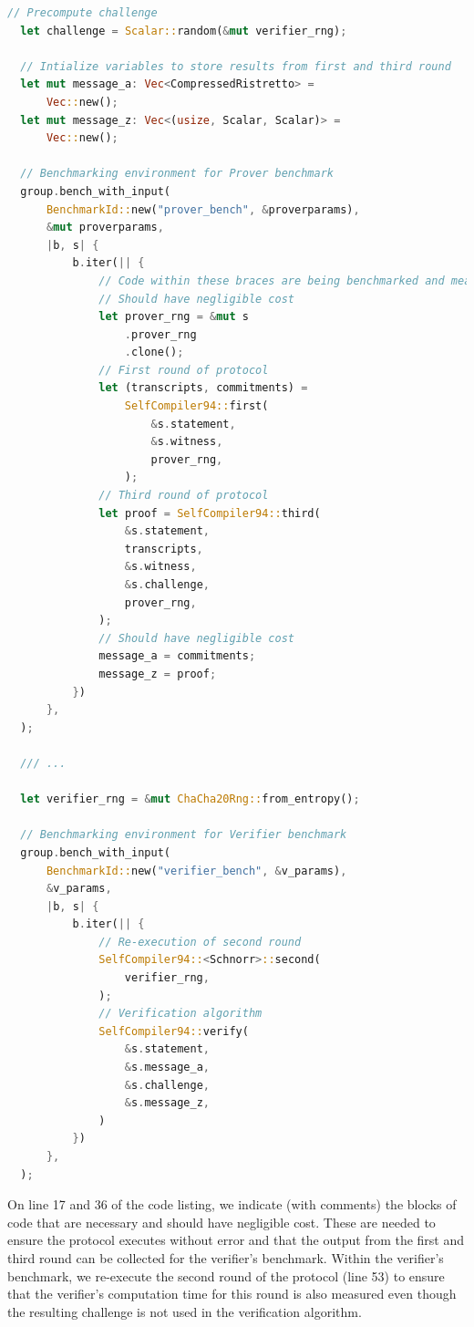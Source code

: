 \begin{lstlisting}[language=rust]
  // Precompute challenge
  let challenge = Scalar::random(&mut verifier_rng);

  // Intialize variables to store results from first and third round 
  let mut message_a: Vec<CompressedRistretto> =
      Vec::new();
  let mut message_z: Vec<(usize, Scalar, Scalar)> =
      Vec::new();

  // Benchmarking environment for Prover benchmark
  group.bench_with_input(
      BenchmarkId::new("prover_bench", &proverparams),
      &mut proverparams,
      |b, s| {
          b.iter(|| {
              // Code within these braces are being benchmarked and measured
              // Should have negligible cost 
              let prover_rng = &mut s
                  .prover_rng
                  .clone();
              // First round of protocol
              let (transcripts, commitments) =
                  SelfCompiler94::first(
                      &s.statement,
                      &s.witness,
                      prover_rng,
                  );
              // Third round of protocol
              let proof = SelfCompiler94::third(
                  &s.statement,
                  transcripts,
                  &s.witness,
                  &s.challenge,
                  prover_rng,
              );
              // Should have negligible cost
              message_a = commitments;
              message_z = proof;
          })
      },
  );

  /// ...

  let verifier_rng = &mut ChaCha20Rng::from_entropy();

  // Benchmarking environment for Verifier benchmark
  group.bench_with_input(
      BenchmarkId::new("verifier_bench", &v_params),
      &v_params,
      |b, s| {
          b.iter(|| {
              // Re-execution of second round
              SelfCompiler94::<Schnorr>::second(
                  verifier_rng,
              );
              // Verification algorithm
              SelfCompiler94::verify(
                  &s.statement,
                  &s.message_a,
                  &s.challenge,
                  &s.message_z,
              )
          })
      },
  );
\end{lstlisting}

On line 17 and 36 of the code listing, we indicate (with comments) the blocks 
of code that are necessary and should have negligible cost. These are needed 
to ensure the protocol executes without error and that the output from the 
first and third round can be collected for the verifier's benchmark. Within the 
verifier's benchmark, we re-execute the second round of the protocol (line 53) to ensure
that the verifier's computation time for this round is also measured even though 
the resulting challenge is not used in the verification algorithm.

